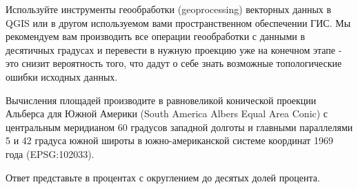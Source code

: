 Используйте инструменты геообработки (geoprocessing) векторных данных в \linebreak QGIS или в другом используемом вами пространственном обеспечении ГИС.  Мы рекомендуем вам производить все операции геообработки с данными в десятичных градусах и перевести в нужную проекцию уже на конечном этапе - это снизит вероятность того, что дадут о себе знать возможные топологические ошибки исходных данных.

Вычисления площадей производите в равновеликой конической проекции Альберса для Южной Америки (South America Albers Equal Area Conic) с центральным меридианом 60 градусов западной долготы и главными параллелями 5 и 42 градуса южной широты в южно-американской системе координат 1969 года (EPSG:102033).

Ответ представьте в процентах с округлением до десятых долей процента.